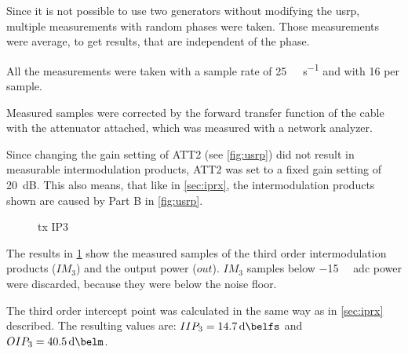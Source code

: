 \documentclass[12pt,a4paper,parskip=full,abstracton]{scrartcl}
\begin{document}
Since it is not possible to use two generators without modifying the \gls{usrp}, multiple
measurements with random phases were taken. Those measurements were average, to get results,
that are independent of the phase.

All the measurements were taken with a sample rate of \SI{25}{\mega\samples\per\second}
and with \SI{16}{\bit} per sample.

Measured samples were corrected by the forward transfer function of the cable with the
attenuator attached, which was measured with a network analyzer.

Since changing the gain setting of ATT2 (see \cref{fig:usrp}) did not result in
measurable intermodulation products, ATT2 was set to a fixed gain setting of
\SI{20}{\deci\bel}. This also means, that like in \cref{sec:iprx}, the intermodulation
products shown are caused by Part B in \cref{fig:usrp}.

\begin{figure}[htb]
    \centering
{}
    \caption{\gls{tx} IP3}
    \label{fig:txip3}
\end{figure}

The results in \cref{fig:txip3} show the measured samples of the third order
intermodulation products ($IM_3$) and the output power ($out$). $IM_3$ samples
below \SI{-15}{\deci\belfs} \gls{adc} power were discarded, because they were
below the noise floor.

The third order intercept point was calculated in the same way as in \cref{sec:iprx}
described. The resulting values are: $IIP_3 = \SI{14.7}{\deci\belfs}$ and
$OIP_3 = \SI{40.5}{\deci\belm}$.

\clearpage
\end{document}
